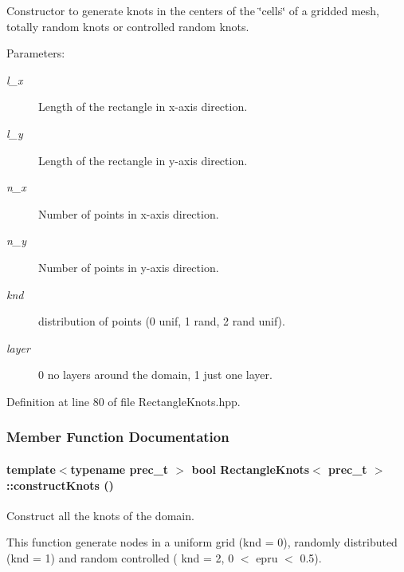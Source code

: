 Constructor to generate knots in the centers of the \char`\"{}cells\char`\"{} of a gridded mesh, totally random knots or controlled random knots. 

\begin{Desc}
\item[Parameters:]
\begin{description}
\item[{\em l\_\-x}]Length of the rectangle in x-axis direction. \item[{\em l\_\-y}]Length of the rectangle in y-axis direction. \item[{\em n\_\-x}]Number of points in x-axis direction. \item[{\em n\_\-y}]Number of points in y-axis direction. \item[{\em knd}]distribution of points (0 unif, 1 rand, 2 rand unif). \item[{\em layer}]0 no layers around the domain, 1 just one layer. \end{description}
\end{Desc}


Definition at line 80 of file RectangleKnots.hpp.

\subsubsection{Member Function Documentation}
\hypertarget{classRectangleKnots_b9906bc5081f67e7f0ce6da2123028bf}{
\paragraph[{constructKnots}]{\setlength{\rightskip}{0pt plus 5cm}template$<$typename prec\_\-t $>$ bool {\bf RectangleKnots}$<$ prec\_\-t $>$::constructKnots ()}\hfill}
\label{classRectangleKnots_b9906bc5081f67e7f0ce6da2123028bf}


Construct all the knots of the domain. 

This function generate nodes in a uniform grid (knd = 0), randomly distributed (knd = 1) and random controlled ( knd = 2, 0 $<$ epru $<$ 0.5).

